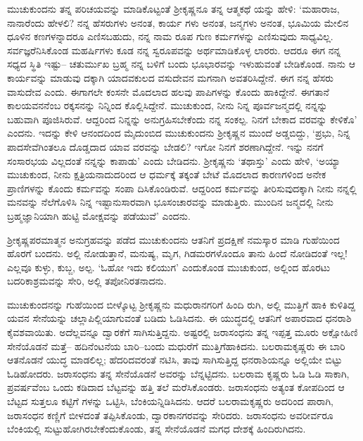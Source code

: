 ಮುಚುಕುಂದನು ತನ್ನ ಪರಿಚಯವನ್ನು ಮಾಡಿಕೊಟ್ಟಂತೆ ಶ್ರೀಕೃಷ್ಣನೂ ತನ್ನ ಆತ್ಮಕಥೆ ಯನ್ನು ಹೇಳಿ: ‘ಮಹಾರಾಜ, ನಾನಾರೆಂದು ಹೇಳಲಿ? ನನ್ನ ಹೆಸರುಗಳು ಅನಂತ, ಕಾರ್ಯ ಗಳು ಅನಂತ, ಜನ್ಮಗಳು ಅನಂತ, ಭೂಮಿಯ ಮೇಲಿನ ಧೂಳಿನ ಕಣಗಳನ್ನಾದರೂ ಎಣಿಸಬಹುದು, ನನ್ನ ನಾಮ ರೂಪ ಗುಣ ಕರ್ಮಗಳನ್ನು ಎಣಿಸುವುದು ಸಾಧ್ಯವಿಲ್ಲ. ಸರ್ವಜ್ಞರೆನಿಸಿಕೊಂಡ ಮಹರ್ಷಿಗಳು ಕೂಡ ನನ್ನ ಸ್ವರೂಪವನ್ನು ಅರ್ಥಮಾಡಿಕೊಳ್ಳ ಲಾರರು. ಆದರೂ ಈಗ ನನ್ನ ಸಧ್ಯದ ಸ್ಥಿತಿ ಇಷ್ಟು– ಚತುರ್ಮುಖ ಬ್ರಹ್ಮ ನನ್ನ ಬಳಿಗೆ ಬಂದು ಭೂಭಾರವನ್ನು ಇಳುಹುವಂತೆ ಬೇಡಿಕೊಂಡ. ನಾನು ಆ ಕಾರ್ಯವನ್ನು ಮಾಡುವು ದಕ್ಕಾಗಿ ಯಾದವಕುಲದ ವಸುದೇವನ ಮಗನಾಗಿ ಅವತರಿಸಿದ್ದೇನೆ. ಈಗ ನನ್ನ ಹೆಸರು ವಾಸುದೇವ ಎಂದು. ಈಗಾಗಲೇ ಕಂಸನೇ ಮೊದಲಾದ ಹಲವು ಪಾಪಿಗಳನ್ನು ಕೊಂದು ಹಾಕಿದ್ದೇನೆ. ಈಗತಾನೆ ಕಾಲಯವನನೆಂಬ ರಕ್ಕಸನನ್ನು ನಿನ್ನಿಂದ ಕೊಲ್ಲಿಸಿದ್ದೇನೆ. ಮುಚುಕುಂದ, ನೀನು ನಿನ್ನ ಪೂರ್ವಜನ್ಮದಲ್ಲಿ ನನ್ನನ್ನು ಬಹುವಾಗಿ ಪೂಜಿಸಿರುವೆ. ಆದ್ದರಿಂದ ನಿನ್ನನ್ನು ಅನುಗ್ರಹಿಸಬೇಕೆಂದು ನನ್ನ ಸಂಕಲ್ಪ. ನಿನಗೆ ಬೇಕಾದ ವರವನ್ನು ಕೇಳಿಕೊ’ ಎಂದನು. ಇದನ್ನು ಕೇಳಿ ಆನಂದದಿಂದ ಮೈದುಂಬಿದ ಮುಚುಕುಂದನು ಶ್ರೀಕೃಷ್ಣನ ಮುಂದೆ ಅಡ್ಡಬಿದ್ದು, ‘ಪ್ರಭು, ನಿನ್ನ ಪಾದಸೇವೆಗಿಂತಲೂ ದೊಡ್ಡದಾದ ಯಾವ ವರವನ್ನು ಬೇಡಲಿ? ಇಗೋ ನಿನಗೆ ಶರಣಾಗಿದ್ದೇನೆ. ಇನ್ನು ನನಗೆ ಸಂಸಾರಭಯ ವಿಲ್ಲದಂತೆ ನನ್ನನ್ನು ಕಾಪಾಡು’ ಎಂದು ಬೇಡಿದನು. ಶ್ರೀಕೃಷ್ಣನು ‘ತಥಾಸ್ತು’ ಎಂದು ಹೇಳಿ, ‘ಅಯ್ಯಾ ಮುಚುಕುಂದ, ನೀನು ಕ್ಷತ್ರಿಯನಾದುದರಿಂದ ಆ ಧರ್ಮಕ್ಕೆ ತಕ್ಕಂತೆ ಬೇಟೆ ಮೊದಲಾದ ಕಾರಣಗಳಿಂದ ಅನೇಕ ಪ್ರಾಣಿಗಳನ್ನು ಕೊಂದು ಕರ್ಮವನ್ನು ಸಂಪಾ ದಿಸಿಕೊಂಡಿರುವೆ. ಆದ್ದರಿಂದ ಕರ್ಮವನ್ನು ತೀರಿಸುವುದಕ್ಕಾಗಿ ನೀನು ನನ್ನಲ್ಲಿ ಮನವನ್ನು ನೆಲೆಗೊಳಿಸಿ ನಿನ್ನ ಇಷ್ಟಾನುಸಾರವಾಗಿ ಭೂಸಂಚಾರವನ್ನು ಮಾಡುತ್ತಿರು. ಮುಂದಿನ ಜನ್ಮದಲ್ಲಿ ನೀನು ಬ್ರಹ್ಮಜ್ಞಾನಿಯಾಗಿ ಹುಟ್ಟಿ ಮೋಕ್ಷವನ್ನು ಪಡೆಯುವೆ’ ಎಂದನು.

ಶ್ರೀಕೃಷ್ಣಪರಮಾತ್ಮನ ಅನುಗ್ರಹವನ್ನು ಪಡೆದ ಮುಚುಕುಂದನು ಆತನಿಗೆ ಪ್ರದಕ್ಷಿಣೆ ನಮಸ್ಕಾರ ಮಾಡಿ ಗುಹೆಯಿಂದ ಹೊರಗೆ ಬಂದನು. ಅಲ್ಲಿ ನೋಡುತ್ತಾನೆ, ಮನುಷ್ಯ, ಮೃಗ, ಗಿಡಮರಗಳೊಂದೂ ತಾನು ಹಿಂದೆ ನೋಡಿದಂತೆ ಇಲ್ಲ! ಎಲ್ಲವೂ ಕುಳ್ಳು, ಕುಬ್ಜ, ಅಲ್ಪ. ‘ಓಹೋ ಇದು ಕಲಿಯುಗ’ ಎಂದುಕೊಂಡ ಮುಚುಕುಂದ, ಅಲ್ಲಿಂದ ಹೊರಟು ಬದರಿಕಾಶ್ರಮವನ್ನು ಸೇರಿ, ಅಲ್ಲಿ ತಪೋನಿರತನಾದನು.

ಮುಚುಕುಂದನನ್ನು ಗುಹೆಯಿಂದ ಬೀಳ್ಕೊಟ್ಟ ಶ್ರೀಕೃಷ್ಣನು ಮಧುರಾನಗರಿಗೆ ಹಿಂದಿ ರುಗಿ, ಅಲ್ಲಿ ಮುತ್ತಿಗೆ ಹಾಕಿ ಕುಳಿತಿದ್ದ ಯವನ ಸೇನೆಯನ್ನು ಚಲ್ಲಾಪಿಲ್ಲಿಯಾಗುವಂತೆ ಬಡಿದು ಓಡಿಸಿದನು. ಈ ಯುದ್ಧದಲ್ಲಿ ಆತನಿಗೆ ಅಪಾರವಾದ ಧನರಾಶಿ ಕೈವಶವಾಯಿತು. ಅದೆಲ್ಲವನ್ನೂ ದ್ವಾರಕೆಗೆ ಸಾಗಿಸುತ್ತಿದ್ದನು. ಅಷ್ಟರಲ್ಲಿ ಜರಾಸಂಧನು ತನ್ನ ಇಪ್ಪತ್ತ ಮೂರು ಅಕ್ಷೋಹಿಣಿ ಸೇನೆಯೊಡನೆ ಮತ್ತೆ– ಹದಿನೆಂಟನೆಯ ಬಾರಿ–ಬಂದು ಮಧುರೆಗೆ ಮುತ್ತಿಗೆಹಾಕಿದನು. ಬಲರಾಮಕೃಷ್ಣರು ಈ ಬಾರಿ ಆತನೊಡನೆ ಯುದ್ಧ ಮಾಡಲಿಲ್ಲ; ಹೆದರಿದವರಂತೆ ನಟಿಸಿ, ತಾವು ಸಾಗಿಸುತ್ತಿದ್ದ ಧನರಾಶಿಯನ್ನೂ ಅಲ್ಲಿಯೇ ಬಿಟ್ಟು ಓಡಿಹೋದರು. ಜರಾಸಂಧನು ತನ್ನ ಸೇನೆಯೊಡನೆ ಅವರನ್ನು ಬೆನ್ನಟ್ಟಿದನು. ಬಲರಾಮ ಕೃಷ್ಣರು ಓಡಿ ಓಡಿ ಸಾಕಾಗಿ, ಪ್ರವರ್ಷವೆಂಬ ಒಂದು ಕಡಿದಾದ ಬೆಟ್ಟವನ್ನು ಹತ್ತಿ ತಲೆ ಮರೆಸಿಕೊಂಡರು. ಜರಾಸಂಧನು ಅತ್ಯಂತ ಕೋಪದಿಂದ ಆ ಬೆಟ್ಟದ ಸುತ್ತಲೂ ಕಟ್ಟಿಗೆ ಗಳನ್ನು ಒಟ್ಟಿಸಿ, ಬೆಂಕಿಯನ್ನಿಡಿಸಿದನು. ಆದರೆ ಬಲರಾಮಕೃಷ್ಣರು ಅದರಿಂದ ಪಾರಾಗಿ, ಜರಾಸಂಧನ ಕಣ್ಣಿಗೆ ಬೀಳದಂತೆ ತಪ್ಪಿಸಿಕೊಂಡು, ದ್ವಾರಕಾನಗರವನ್ನು ಸೇರಿದರು. ಜರಾಸಂಧನು ಅವರೀರ್ವರೂ ಬೆಂಕಿಯಲ್ಲಿ ಸುಟ್ಟುಹೋಗಿರಬೇಕೆಂದುಕೊಂಡು, ತನ್ನ ಸೇನೆಯೊಡನೆ ಮಗಧ ದೇಶಕ್ಕೆ ಹಿಂದಿರುಗಿದನು.

